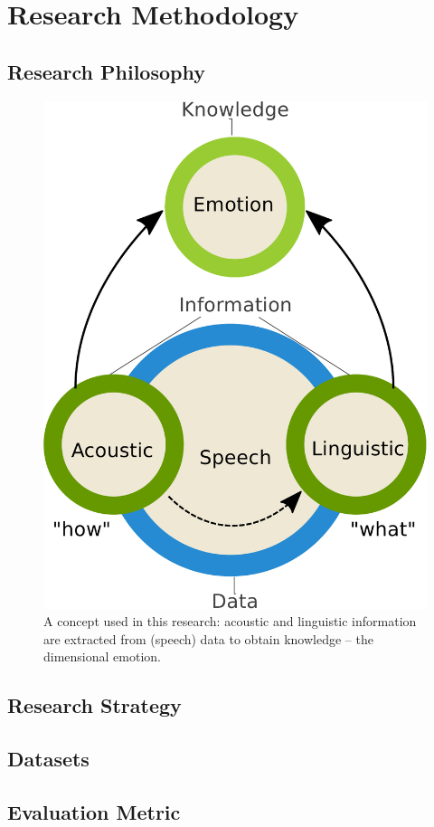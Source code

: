 \chapter{Research Methodology}

\section{Research Philosophy}
\begin{figure}[htbp]
    \centering
    \includegraphics[width=.5\textwidth]{../fig/concept-crop.pdf}
    \caption{A concept used in this research: acoustic and linguistic information are extracted from (speech) data to obtain knowledge -- the dimensional emotion.}
    \label{fig:research_concept}
\end{figure}
\section{Research Strategy}
\section{Datasets}
\section{Evaluation Metric}

